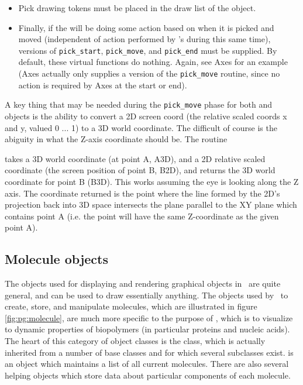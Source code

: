 \begin{itemize}
  \item Pick drawing tokens must be placed in the draw list of the object.

  \item Finally, if the  will be doing some action based on when it is picked and moved (independent of action performed by 's during this same time), versions of {\tt pick\_start}, {\tt pick\_move}, and {\tt pick\_end} must be supplied.  By default, these virtual functions do nothing.  Again,  see Axes for an example (Axes actually only supplies a version of the {\tt pick\_move} routine, since no action is required by Axes at the start or end).

\end{itemize}

A key thing that may be needed during the {\tt pick\_move} phase for both  and  objects is the ability to convert a 2D screen coord (the relative scaled coords x and y, valued 0 ... 1) to a 3D world coordinate.  The difficult of course is the abiguity in what the Z-axis coordinate should be.  The routine
\begin{center}
   \end{center}
takes a 3D world coordinate (at point A, A3D), and a 2D relative scaled coordinate (the screen position of point B, B2D), and returns the 3D world coordinate for point B (B3D).  This works assuming the eye is looking along the Z axis.  The coordinate returned is the point where the line formed by the 2D's projection back into 3D space intersects the plane parallel to the XY plane which contains point A (i.e. the point will have the same Z-coordinate as the given point A).


\subsection{Molecule objects}

The objects used for displaying and rendering graphical objects in \VMD\ are quite general, and can be used to draw essentially anything.  The objects used by \VMD\ to create, store, and manipulate molecules, which are illustrated in figure \ref{fig:pg:molecule}, are much more specific to the purpose of \VMD, which is to visualize to dynamic properties of biopolymers (in particular proteins and nucleic acids).  The heart of this category of object classes is the  class, which is actually inherited from a number of base classes and for which several subclasses exist.   is an object which maintains a list of all current molecules.  There are also several helping objects which store data about particular components of each molecule.


